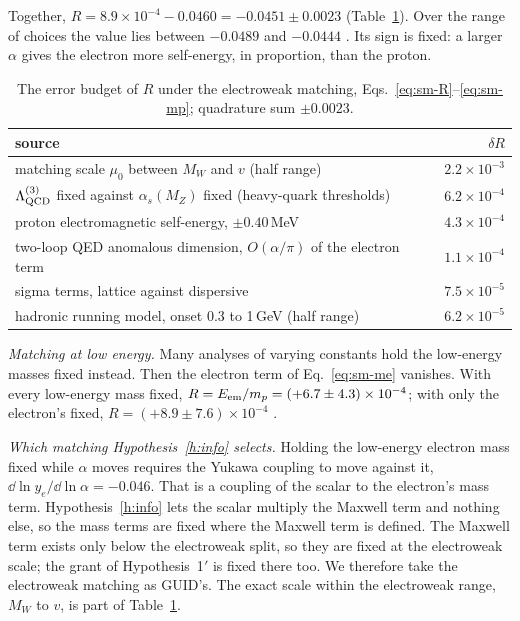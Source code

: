 Together, $R=8.9\times10^{-4}-0.0460=-0.0451\pm0.0023$ (Table~\ref{tab:sm-budget}). Over the range of choices the value lies between $-0.0489$ and
$-0.0444$ . Its sign is fixed: a larger $\alpha$ gives the electron more self-energy, in proportion, than the proton.

\begin{table}[t]
\centering\small
\caption{The error budget of $R$ under the electroweak matching, Eqs.~\eqref{eq:sm-R}--\eqref{eq:sm-mp}; quadrature sum $\pm0.0023$.}\label{tab:sm-budget}
\begin{tabular}{@{}lr@{}}
\toprule
source & $\delta R$ \\
\midrule
matching scale $\mu_0$ between $M_W$ and $v$ (half range) & $2.2\times10^{-3}$ \\
$\Lambda^{(3)}_{\rm QCD}$ fixed against $\alpha_s(M_Z)$ fixed (heavy-quark thresholds) & $6.2\times10^{-4}$ \\
proton electromagnetic self-energy, $\pm0.40$\,MeV & $4.3\times10^{-4}$ \\
two-loop QED anomalous dimension, $O(\alpha/\pi)$ of the electron term & $1.1\times10^{-4}$ \\
sigma terms, lattice against dispersive & $7.5\times10^{-5}$ \\
hadronic running model, onset 0.3 to 1\,GeV (half range) & $6.2\times10^{-5}$ \\
\bottomrule
\end{tabular}
\end{table}

\emph{Matching at low energy.} Many analyses of varying constants hold the low-energy masses fixed instead. Then the electron term of
Eq.~\eqref{eq:sm-me} vanishes. With every low-energy mass fixed, $R=E_{\rm em}/m_p=(+6.7\pm4.3)\times10^{-4}$; with only the electron's fixed,
$R=(+8.9\pm7.6)\times10^{-4}$ .

\emph{Which matching Hypothesis~\ref{h:info} selects.} Holding the low-energy electron mass fixed while $\alpha$ moves requires the Yukawa
coupling to move against it, $\dd\ln y_e/\dd\ln\alpha=-0.046$. That is a coupling of the scalar to the electron's mass term. Hypothesis~\ref{h:info}
lets the scalar multiply the Maxwell term and nothing else, so the mass terms are fixed where the Maxwell term is defined. The Maxwell term
exists only below the electroweak split, so they are fixed at the electroweak scale; the grant of Hypothesis~1$'$ is fixed there too. We
therefore take the electroweak matching as GUID's. The exact scale within the electroweak range, $M_W$ to $v$, is part of
Table~\ref{tab:sm-budget}.

